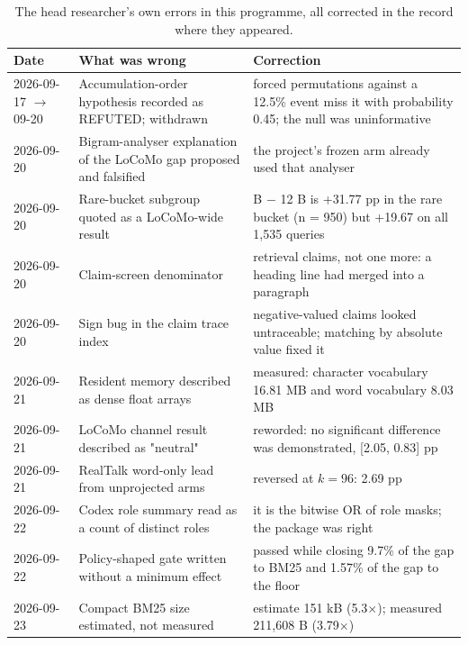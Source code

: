 \begin{table}[tbp]
\centering
\footnotesize
\caption{The head researcher's own errors in this programme, all corrected in the record where they appeared.}
\label{tab:corrections}
\begin{tabularx}{\linewidth}{@{}l >{\raggedright\arraybackslash}p{5.2cm} >{\raggedright\arraybackslash}X@{}}
\toprule
Date & What was wrong & Correction \\
\midrule
2026-09-17 $\to$ 09-20 & Accumulation-order hypothesis recorded as REFUTED; withdrawn & 6 forced permutations against a 12.5\% event miss it with probability 0.45; the null was uninformative \\
2026-09-20 & Bigram-analyser explanation of the LoCoMo gap proposed and falsified & the project's frozen arm already used that analyser \\
2026-09-20 & Rare-bucket subgroup quoted as a LoCoMo-wide result & 48 B $-$ 12 B is +31.77 pp in the rare bucket (n = 950) but +19.67 on all 1{,}535 queries \\
2026-09-20 & Claim-screen denominator & 37 retrieval claims, not one more: a heading line had merged into a paragraph \\
2026-09-20 & Sign bug in the claim trace index & negative-valued claims looked untraceable; matching by absolute value fixed it \\
2026-09-21 & Resident memory described as dense float arrays & measured: character vocabulary 16.81 MB and word vocabulary 8.03 MB \\
2026-09-21 & LoCoMo channel result described as "neutral" & reworded: no significant difference was demonstrated, [\textminus{}2.05, 0.83] pp \\
2026-09-21 & RealTalk word-only lead from unprojected arms & reversed at $k=96$: \textminus{}2.69 pp \\
2026-09-22 & Codex role summary read as a count of distinct roles & it is the bitwise OR of role masks; the package was right \\
2026-09-22 & Policy-shaped gate written without a minimum effect & passed while closing 9.7\% of the gap to BM25 and 1.57\% of the gap to the floor \\
2026-09-23 & Compact BM25 size estimated, not measured & estimate 151 kB (5.3$\times$); measured 211{,}608 B (3.79$\times$) \\
\bottomrule
\end{tabularx}
\end{table}
